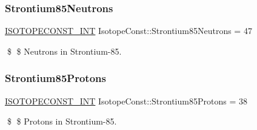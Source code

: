 \subsubsection{\texorpdfstring{Strontium85\+Neutrons}{Strontium85Neutrons}}
{\footnotesize\ttfamily \mbox{\hyperlink{group___isotope_const-_macros_ga5f18360b3e99483a35c32d789e62621c}{I\+S\+O\+T\+O\+P\+E\+C\+O\+N\+S\+T\+\_\+\+I\+NT}} Isotope\+Const\+::\+Strontium85\+Neutrons = 47}

\$ \$ Neutrons in Strontium-\/85. \mbox{\label{group___isotope_const-_strontium-_sr85_ga07fb63445e2449748619d6d678cbc86e}} 
\subsubsection{\texorpdfstring{Strontium85\+Protons}{Strontium85Protons}}
{\footnotesize\ttfamily \mbox{\hyperlink{group___isotope_const-_macros_ga5f18360b3e99483a35c32d789e62621c}{I\+S\+O\+T\+O\+P\+E\+C\+O\+N\+S\+T\+\_\+\+I\+NT}} Isotope\+Const\+::\+Strontium85\+Protons = 38}

\$ \$ Protons in Strontium-\/85. 